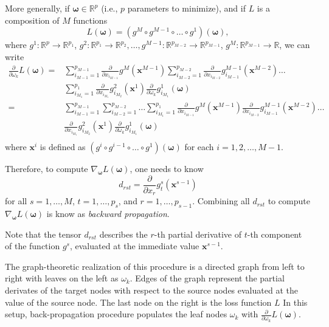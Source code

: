 \documentclass[
]{article}
\begin{document}
More generally, if \(\boldsymbol{\omega}\in \mathbb{R}^p\) (i.e., \(p\)
parameters to minimize), and if \(L\) is a composition of \(M\)
functions \[
L(\boldsymbol{\omega}) = (g^{M} \circ g^{M-1} \circ \dots \circ g^1)(\boldsymbol{\omega}),
\] where \(g^1: \mathbb{R}^p \to \mathbb{R}^{p_1}\),
\(g^2: \mathbb{R}^{p_1} \to \mathbb{R}^{p_2}, \dots, g^{M-1}: \mathbb{R}^{p_{M-2}} \to \mathbb{R}^{p_{M-1}}\),
\(g^M: \mathbb{R}^{p_{M-1}} \to \mathbb{R}\), we can write
\begin{align*}
    \frac{\partial}{\partial \omega_k} L(\boldsymbol{\omega})  
    = &  
    \sum_{i_{M-1}=1}^{p_{M-1}} 
    \frac{\partial }{\partial x_{i_{M-1}}} g^M(\mathbf{x}^{M-1})
    \sum_{i_{M-2}=1}^{p_{M-2}} 
    \frac{\partial }{\partial x_{i_{M-2}}} g_{i_{M-1}}^{M-1}(\mathbf{x}^{M-2})
    \dots
    \\
    & 
    \sum_{i_{M_1}=1}^{p_1} 
    \frac{\partial }{\partial x_{i_{M_1}}} g_{i_{M_2}}^{2}(\mathbf{x}^1)
    \frac{\partial }{\partial \omega_{k}} g_{i_{M_1}}^{1}(\boldsymbol{\omega})
    \\
    = &  
    \sum_{i_{M-1}=1}^{p_{M-1}} 
    \sum_{i_{M-2}=1}^{p_{M-2}} 
    \dots
    \sum_{i_{M_1}=1}^{p_1} 
    \frac{\partial }{\partial x_{i_{M-1}}} g^M(\mathbf{x}^{M-1})
    \frac{\partial }{\partial x_{i_{M-2}}} g_{i_{M-1}}^{M-1}(\mathbf{x}^{M-2})
    \dots
    \\
    & 
    \frac{\partial }{\partial x_{i_{M_1}}} g_{i_{M_2}}^{2}(\mathbf{x}^1)
    \frac{\partial }{\partial \omega_{k}} g_{i_{M_1}}^{1}(\boldsymbol{\omega})
    \\
\end{align*} where \(\mathbf{x}^i\) is defined as
\((g^i \circ g^{i-1} \circ \dots \circ g^1) (\boldsymbol{\omega})\) for
each \(i=1, 2, \dots, M-1\).

Therefore, to compute
\(\nabla_{\boldsymbol{\omega}} L(\boldsymbol{\omega})\), one needs to
know \[
d_{rst} = \frac{\partial}{\partial x_r} g^s_t(\mathbf{x}^{s-1})
\] for all \(s=1, \dots, M\), \(t=1, \dots, p_s\), and
\(r=1, \dots, p_{s-1}\). Combining all \(d_{rst}\) to compute
\(\nabla_{\boldsymbol{\omega}} L(\boldsymbol{\omega})\) is know as
\emph{backward propagation}.

Note that the tensor \(d_{rst}\) describes the \(r\)-th partial
derivative of \(t\)-th component of the function \(g^s\), evaluated at
the immediate value \(\mathbf{x}^{s-1}\).

The graph-theoretic realization of this procedure is a directed graph
from left to right with leaves on the left as \(\omega_k\). Edges of the
graph represent the partial derivates of the target nodes with respect
to the source nodes evaluated at the value of the source node. The last
node on the right is the loss function \(L\) In this setup,
back-propagation procedure populates the leaf nodes \(\omega_k\) with
\(\frac{\partial}{\partial \omega_k} L(\boldsymbol{\omega})\).
\end{document}
